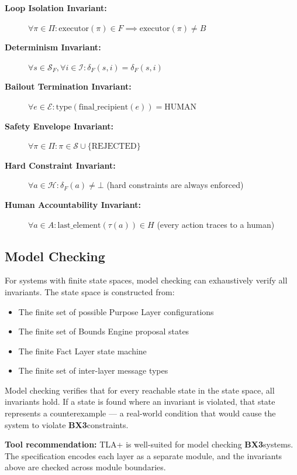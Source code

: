 \documentclass[12pt]{article}
\newcommand{\bxthree}{\textbf{BX3}}
\begin{document}
\begin{description}
\item[\textbf{Loop Isolation Invariant:}] $\forall \pi \in \Pi: \text{executor}(\pi) \in F \implies \text{executor}(\pi) \neq B$
\item[\textbf{Determinism Invariant:}] $\forall s \in \mathcal{S}_F, \forall i \in \mathcal{I}: \delta_F(s, i) = \delta_F(s, i)$
\item[\textbf{Bailout Termination Invariant:}] $\forall e \in \mathcal{E}: \text{type}(\text{final\_recipient}(e)) = \text{HUMAN}$
\item[\textbf{Safety Envelope Invariant:}] $\forall \pi \in \Pi: \pi \in \mathcal{S} \cup \{\text{REJECTED}\}$
\item[\textbf{Hard Constraint Invariant:}] $\forall a \in \mathcal{H}: \delta_F(a) \neq \bot$ (hard constraints are always enforced)
\item[\textbf{Human Accountability Invariant:}] $\forall a \in A: \text{last\_element}(\tau(a)) \in H$ (every action traces to a human)
\end{description}

\subsection{Model Checking}
For systems with finite state spaces, model checking can exhaustively verify all invariants. The state space is constructed from:

\begin{itemize}
\item The finite set of possible Purpose Layer configurations
\item The finite set of Bounds Engine proposal states
\item The finite Fact Layer state machine
\item The finite set of inter-layer message types
\end{itemize}

Model checking verifies that for every reachable state in the state space, all invariants hold. If a state is found where an invariant is violated, that state represents a counterexample — a real-world condition that would cause the system to violate \bxthree constraints.

\textbf{Tool recommendation:} TLA+ is well-suited for model checking \bxthree systems. The specification encodes each layer as a separate module, and the invariants above are checked across module boundaries.
\end{document}
